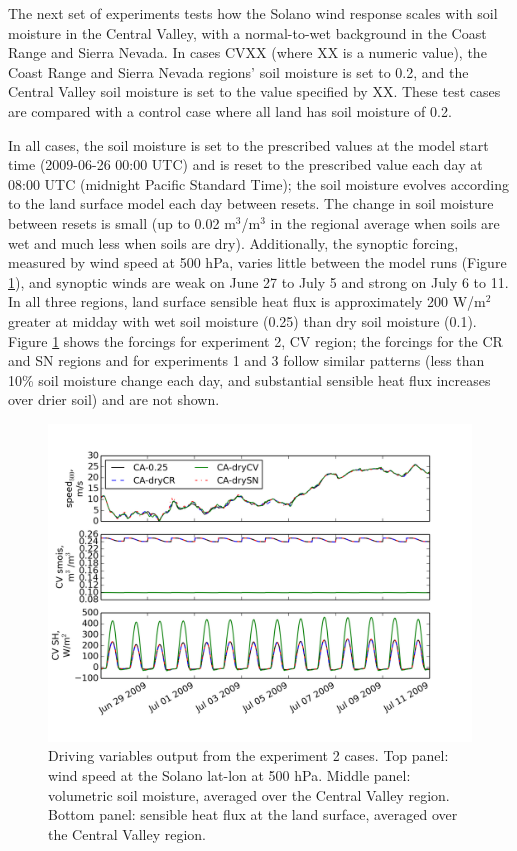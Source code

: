 The next set of experiments tests how the Solano wind response scales with soil moisture in the Central Valley, with a normal-to-wet background in the Coast Range and Sierra Nevada.  In cases CVXX (where XX is a numeric value), the Coast Range and Sierra Nevada regions' soil moisture is set to 0.2, and the Central Valley soil moisture is set to the value specified by XX.  These test cases are compared with a control case where all land has soil moisture of 0.2.

In all cases, the soil moisture is set to the prescribed values at the model start time (2009-06-26 00:00 UTC) and is reset to the prescribed value each day at 08:00 UTC (midnight Pacific Standard Time); the soil moisture evolves according to the land surface model each day between resets.  The change in soil moisture between resets is small (up to 0.02 m$^3$/m$^3$ in the regional average when soils are wet and much less when soils are dry).  Additionally, the synoptic forcing, measured by wind speed at 500 hPa, varies little between the model runs (Figure \ref{fig:windSol_forcings}), and synoptic winds are weak on June 27 to July 5 and strong on July 6 to 11.  In all three regions, land surface sensible heat flux is approximately 200 W/m$^2$ greater at midday with wet soil moisture (0.25) than dry soil moisture (0.1).  Figure \ref{fig:windSol_forcings} shows the forcings for experiment 2, CV region; the forcings for the CR and SN regions and for experiments 1 and 3 follow similar patterns (less than 10\% soil moisture change each day, and substantial sensible heat flux increases over drier soil) and are not shown.

\begin{figure}[here]
\includegraphics[width=1\textwidth]{ch3-wind/img/forcing.png}
\caption{Driving variables output from the experiment 2 cases.  Top panel: wind speed at the Solano lat-lon at 500 hPa.  Middle panel: volumetric soil moisture, averaged over the Central Valley region.  Bottom panel: sensible heat flux at the land surface, averaged over the Central Valley region.}
\label{fig:windSol_forcings}
\end{figure}

